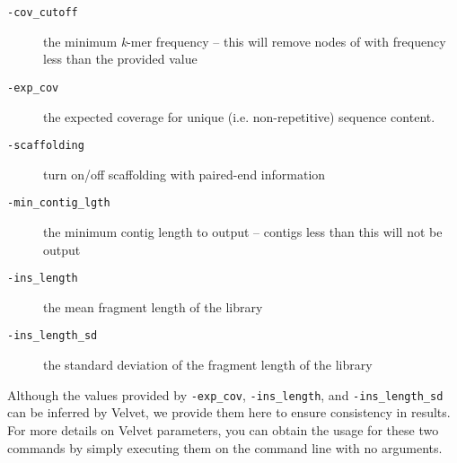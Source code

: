 \documentclass[11pt,a4paper]{scrartcl}
\begin{document}
\begin{description}
  \item[\texttt{-cov_cutoff}] the minimum \emph{k}-mer frequency -- this will remove nodes of with frequency less than the provided value
  \item[\texttt{-exp_cov}] the expected coverage for unique (i.e. non-repetitive) sequence content. 
  \item[\texttt{-scaffolding}] turn on/off scaffolding with paired-end information
  \item[\texttt{-min_contig_lgth}] the minimum contig length to output -- contigs less than this will not be output
  \item[\texttt{-ins_length}] the mean fragment length of the library
  \item[\texttt{-ins_length_sd}] the standard deviation of the fragment length of the library
\end{description}

Although the values provided by \texttt{-exp_cov}, \texttt{-ins_length}, and \texttt{-ins_length_sd} can be inferred by Velvet,
we provide them here to ensure consistency in results. For more details on Velvet parameters, you can obtain the usage for these two commands by simply
executing them on the command line with no arguments.
\end{document}
